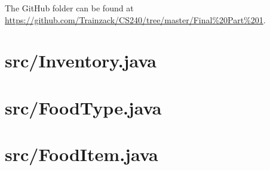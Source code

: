 \documentclass[letterpaper, 11pt]{article}
\title{}
\author{Eli Zupke}
\newcommand{\inputcode}[1]{
	
	\needspace{5em}
	\section{#1}
	
	\vspace{5em}
	\pagebreak[3]
	
}
\begin{document}
\maketitle

The GitHub folder can be found at \url{https://github.com/Trainzack/CS240/tree/master/Final%20Part%201}.

\tableofcontents

\inputcode{src/Inventory.java}
\inputcode{src/FoodType.java}
\inputcode{src/FoodItem.java}
\end{document}
